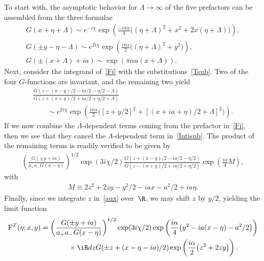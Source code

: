 \documentclass[pdftex]{sigma}
\numberwithin{equation}{section}
\begin{document}
To start with, the asymptotic behavior for $\Lambda\to\infty$ of the f\/ive prefactors can be assembled from the three formulae
\begin{gather}\label{as1}
G(x+\eta+\Lambda)\sim e^{-i\chi}\exp\left(\frac{-i\pi\alpha}{4}\big((\eta+\Lambda)^2+x^2+2x(\eta+\Lambda)\big)\right),
\\
\label{as2}
G(\pm y-\eta-\Lambda)\sim e^{2i\chi}\exp\left(\frac{i\pi\alpha}{2}\big((\eta+\Lambda)^2+y^2\big)\right),
\\
\label{as3}
G(\pm (x+\Lambda)+ia)\sim \exp(\pi\alpha a(x+\Lambda)).
\end{gather}
Next, consider the integrand of~\eqref{Fi} with the substitutions~\eqref{Tsub}. Two of the four $G$-functions are invariant, and the remaining two yield
\begin{gather}
\frac{G(z-(x-y)/2-ia/2-\eta/2-\Lambda)}{G(z+(x+y)/2+ia/2+\eta/2+\Lambda)}\nonumber\\
\qquad{} \sim e^{2i\chi}\exp\left(\frac{i\pi\alpha}{2}\big([z+y/2]^2+[(x+ia+\eta)/2+\Lambda]^2\big)\right).\label{Intisub}
\end{gather}
If we now combine the $\Lambda$-dependent terms coming from the prefactor in~\eqref{Fi}, then we see that they cancel the $\Lambda$-dependent term in~\eqref{Intisub}. The product of the remaining terms is readily verif\/ied to be given by
\begin{gather}\label{aux}
\left(\frac{G(\pm y+ia)}{a_{+}a_-G(x-\eta)}\right)^{1/2} \exp(3i\chi/2)\frac{G(z+(x-y)/2-ia/2-\eta/2)}{G(z-(x+y)/2+ia/2+\eta/2)}\exp\left( \frac{i\alpha}{4}M\right),
\end{gather}
with
\begin{gather}
M\equiv 2z^2+2zy-y^2/2-iax-a^2/2+ia\eta.
\end{gather}
Finally, since we integrate $z$ in~\eqref{aux} over~$\R$, we may shift $z$ by $y/2$, yielding the limit function
\begin{gather}
{\rm F}^T(\eta;x,y)  =   \left(\frac{G(\pm y+ia)}{a_{+}a_-G(x-\eta)}\right)^{1/2} \exp(3i\chi/2)\exp\left( \frac{i\alpha}{4}\big(y^2-ia(x-\eta)-a^2/2\big)\right)
\nonumber \\
\phantom{{\rm F}^T(\eta;x,y)  =}{}  \times \iR dz G(\pm z +(x-\eta-ia)/2)
 \exp\left( \frac{i\alpha}{2}\big(z^2+2zy\big)\right).\label{T1}
 \end{gather}
\end{document}

